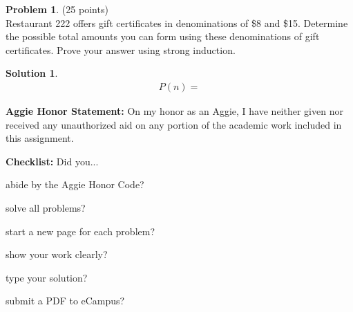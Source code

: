 \documentclass{article}
\theoremstyle{definition}
\newtheorem{problem}{Problem}
\newtheorem*{solution}{Solution}
\newcommand{\honor}{\noindent \textbf{Aggie Honor Statement: }On my honor as an Aggie, I have neither
  given nor received any unauthorized aid on any portion of the academic work included in this assignment.
}
\newcommand{\checklist}{\noindent\textbf{Checklist:}
Did you...
\begin{compactenum}
\item abide by the Aggie Honor Code?
\item solve all problems?
\item start a new page for each problem?
\item show your work clearly?
\item type your solution?
\item submit a PDF to eCampus?
\end{compactenum}
}
\begin{document}


\begin{problem} (25 points)\\
Restaurant 222 offers gift certificates in denominations of \$8 and \$15.  Determine the possible total amounts you can form using these denominations of gift certificates.  Prove your answer using strong induction.
\end{problem}

\begin{solution}\ \\
  \begin{align*}
    P(n) = 
  \end{align*}
\end{solution}


\bigskip
\honor

\bigskip
\checklist
\end{document}
